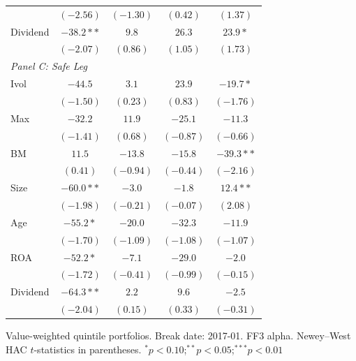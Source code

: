 \begin{tabular}{l c c c c}
 & $(-2.56)$ & $(-1.30)$ & $(0.42)$ & $(1.37)$ \\
Dividend & $-38.2**$ & $9.8$ & $26.3$ & $23.9*$ \\
 & $(-2.07)$ & $(0.86)$ & $(1.05)$ & $(1.73)$ \\
\midrule
\multicolumn{5}{l}{\textit{Panel C: Safe Leg}} \\
Ivol & $-44.5$ & $3.1$ & $23.9$ & $-19.7*$ \\
 & $(-1.50)$ & $(0.23)$ & $(0.83)$ & $(-1.76)$ \\
Max & $-32.2$ & $11.9$ & $-25.1$ & $-11.3$ \\
 & $(-1.41)$ & $(0.68)$ & $(-0.87)$ & $(-0.66)$ \\
BM & $11.5$ & $-13.8$ & $-15.8$ & $-39.3**$ \\
 & $(0.41)$ & $(-0.94)$ & $(-0.44)$ & $(-2.16)$ \\
Size & $-60.0**$ & $-3.0$ & $-1.8$ & $12.4**$ \\
 & $(-1.98)$ & $(-0.21)$ & $(-0.07)$ & $(2.08)$ \\
Age & $-55.2*$ & $-20.0$ & $-32.3$ & $-11.9$ \\
 & $(-1.70)$ & $(-1.09)$ & $(-1.08)$ & $(-1.07)$ \\
ROA & $-52.2*$ & $-7.1$ & $-29.0$ & $-2.0$ \\
 & $(-1.72)$ & $(-0.41)$ & $(-0.99)$ & $(-0.15)$ \\
Dividend & $-64.3**$ & $2.2$ & $9.6$ & $-2.5$ \\
 & $(-2.04)$ & $(0.15)$ & $(0.33)$ & $(-0.31)$ \\
\bottomrule
\end{tabular}
\vspace{4pt}
\begin{minipage}{0.9\textwidth}
\footnotesize
Value-weighted quintile portfolios. Break date: 2017-01. FF3 alpha.
Newey--West HAC $t$-statistics in parentheses.
$^{*}p<0.10$;\quad $^{**}p<0.05$;\quad $^{***}p<0.01$
\end{minipage}